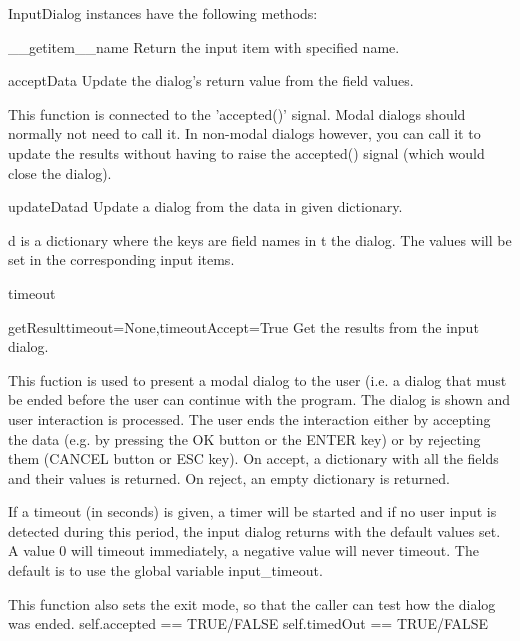 InputDialog instances have the following methods:

\begin{funcdesc}{__getitem__}{name}
Return the input item with specified name.
\end{funcdesc}

\begin{funcdesc}{acceptData}{}
Update the dialog's return value from the field values.

        This function is connected to the 'accepted()' signal.
        Modal dialogs should normally not need to call it.
        In non-modal dialogs however, you can call it to update the
        results without having to raise the accepted() signal (which
        would close the dialog).
        
\end{funcdesc}

\begin{funcdesc}{updateData}{d}
Update a dialog from the data in given dictionary.

        d is a dictionary where the keys are field names in t the dialog.
        The values will be set in the corresponding input items.
        
\end{funcdesc}

\begin{funcdesc}{timeout}{}

\end{funcdesc}

\begin{funcdesc}{getResult}{timeout=None,timeoutAccept=True}
 Get the results from the input dialog.

        This fuction is used to present a modal dialog to the user (i.e. a
        dialog that must be ended before the user can continue with the
        program. The dialog is shown and user interaction is processed.
        The user ends the interaction either by accepting the data (e.g. by
        pressing the OK button or the ENTER key) or by rejecting them (CANCEL
        button or ESC key).
        On accept, a dictionary with all the fields and their values is
        returned. On reject, an empty dictionary is returned.
        
        If a timeout (in seconds) is given, a timer will be started and if no
        user input is detected during this period, the input dialog returns
        with the default values set.
        A value 0 will timeout immediately, a negative value will never timeout.
        The default is to use the global variable input_timeout.

        This function also sets the exit mode, so that the caller can test how
        the dialog was ended.
        self.accepted == TRUE/FALSE
        self.timedOut == TRUE/FALSE
        
\end{funcdesc}

